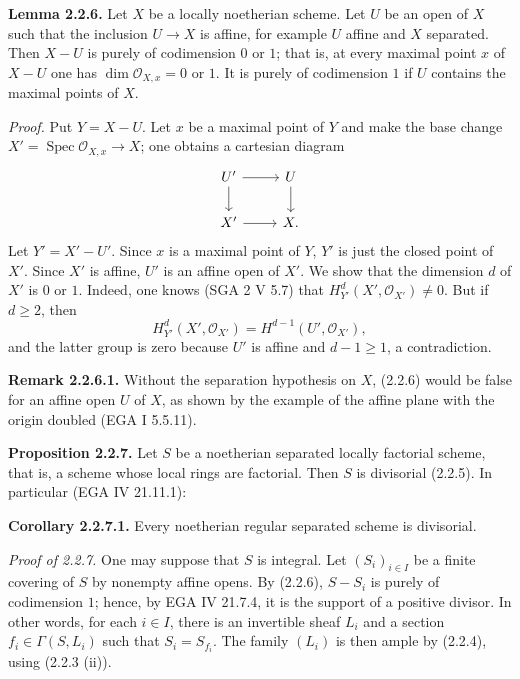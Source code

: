 \documentclass[11pt]{article}
\begin{document}
\textbf{Lemma 2.2.6.} Let $X$ be a locally noetherian scheme. Let $U$ be an open of $X$ such that the inclusion $U\to X$ is affine, for example $U$ affine and $X$ separated. Then $X-U$ is purely of codimension $0$ or $1$; that is, at every maximal point $x$ of $X-U$ one has $\dim\mathcal O_{X,x}=0$ or $1$. It is purely of codimension $1$ if $U$ contains the maximal points of $X$.

\emph{Proof.} Put $Y=X-U$. Let $x$ be a maximal point of $Y$ and make the base change $X'=\operatorname{Spec}\mathcal O_{X,x}\to X$; one obtains a cartesian diagram
\[
\begin{tikzcd}
U' \arrow[r] \arrow[d] & U \arrow[d] \\
X' \arrow[r] & X .
\end{tikzcd}
\]
Let $Y'=X'-U'$. Since $x$ is a maximal point of $Y$, $Y'$ is just the closed point of $X'$. Since $X'$ is affine, $U'$ is an affine open of $X'$. We show that the dimension $d$ of $X'$ is $0$ or $1$. Indeed, one knows (SGA 2 V 5.7) that $H^d_{Y'}(X',\mathcal O_{X'})\ne0$. But if $d\ge2$, then
\[
H^d_{Y'}(X',\mathcal O_{X'})=H^{d-1}(U',\mathcal O_{X'}),
\]
and the latter group is zero because $U'$ is affine and $d-1\ge1$, a contradiction.

\textbf{Remark 2.2.6.1.} Without the separation hypothesis on $X$, (2.2.6) would be false for an affine open $U$ of $X$, as shown by the example of the affine plane with the origin doubled (EGA I 5.5.11).

\textbf{Proposition 2.2.7.} Let $S$ be a noetherian separated locally factorial scheme, that is, a scheme whose local rings are factorial. Then $S$ is divisorial (2.2.5). In particular (EGA IV 21.11.1):

\textbf{Corollary 2.2.7.1.} Every noetherian regular separated scheme is divisorial.

\emph{Proof of 2.2.7.} One may suppose that $S$ is integral. Let $(S_i)_{i\in I}$ be a finite covering of $S$ by nonempty affine opens. By (2.2.6), $S-S_i$ is purely of codimension $1$; hence, by EGA IV 21.7.4, it is the support of a positive divisor. In other words, for each $i\in I$, there is an invertible sheaf $L_i$ and a section $f_i\in\Gamma(S,L_i)$ such that $S_i=S_{f_i}$. The family $(L_i)$ is then ample by (2.2.4), using (2.2.3 (ii)).
\end{document}
